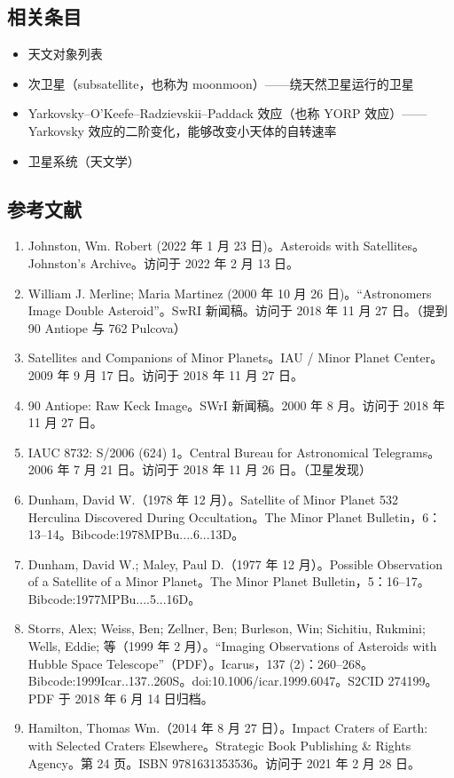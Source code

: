 \subsection{相关条目}
\begin{itemize}
\item 天文对象列表
\item 次卫星（subsatellite，也称为 moonmoon）——绕天然卫星运行的卫星
\item Yarkovsky–O'Keefe–Radzievskii–Paddack 效应（也称 YORP 效应）——Yarkovsky 效应的二阶变化，能够改变小天体的自转速率
\item 卫星系统（天文学）
\end{itemize}
\subsection{参考文献}
\begin{enumerate}
\item Johnston, Wm. Robert (2022 年 1 月 23 日)。Asteroids with Satellites。Johnston's Archive。访问于 2022 年 2 月 13 日。
\item William J. Merline; Maria Martinez (2000 年 10 月 26 日)。“Astronomers Image Double Asteroid”。SwRI 新闻稿。访问于 2018 年 11 月 27 日。（提到 90 Antiope 与 762 Pulcova）
\item Satellites and Companions of Minor Planets。IAU / Minor Planet Center。2009 年 9 月 17 日。访问于 2018 年 11 月 27 日。
\item 90 Antiope: Raw Keck Image。SWrI 新闻稿。2000 年 8 月。访问于 2018 年 11 月 27 日。
\item IAUC 8732: S/2006 (624) 1。Central Bureau for Astronomical Telegrams。2006 年 7 月 21 日。访问于 2018 年 11 月 26 日。（卫星发现）
\item Dunham, David W.（1978 年 12 月）。Satellite of Minor Planet 532 Herculina Discovered During Occultation。The Minor Planet Bulletin，6：13–14。Bibcode:1978MPBu....6...13D。
\item Dunham, David W.; Maley, Paul D.（1977 年 12 月）。Possible Observation of a Satellite of a Minor Planet。The Minor Planet Bulletin，5：16–17。Bibcode:1977MPBu....5...16D。
\item Storrs, Alex; Weiss, Ben; Zellner, Ben; Burleson, Win; Sichitiu, Rukmini; Wells, Eddie; 等（1999 年 2 月）。“Imaging Observations of Asteroids with Hubble Space Telescope”（PDF）。Icarus，137 (2)：260–268。Bibcode:1999Icar..137..260S。doi:10.1006/icar.1999.6047。S2CID 274199。PDF 于 2018 年 6 月 14 日归档。
\item Hamilton, Thomas Wm.（2014 年 8 月 27 日）。Impact Craters of Earth: with Selected Craters Elsewhere。Strategic Book Publishing & Rights Agency。第 24 页。ISBN 9781631353536。访问于 2021 年 2 月 28 日。

\end{enumerate}
